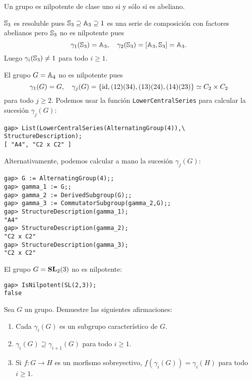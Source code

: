 
\begin{example}
	Un grupo es nilpotente de clase uno si y sólo si es abeliano.
\end{example}

\begin{example}
	$\mathbb{S}_3$ es resoluble pues $\mathbb{S}_3\supseteq \mathbb{A}_3\supseteq 1$ es una serie
	de composición con factores abelianos pero $\mathbb{S}_3$ no es nilpotente pues
	\[
		\gamma_1(\mathbb{S}_3)=\mathbb{A}_3,\quad
		\gamma_2(\mathbb{S}_3)=[\mathbb{A}_3,\mathbb{S}_3]=\mathbb{A}_3.
	\]
	Luego $\gamma_i(\mathbb{S}_3)\ne1$ para todo $i\geq1$. 
\end{example}

\begin{example}
	El grupo $G=\mathbb{A}_4$ no es nilpotente pues 
	\[
		\gamma_1(G)=G,\quad
		\gamma_j(G)=\{\operatorname{id},(12)(34),(13)(24),(14)(23)\}\simeq C_2\times C_2
	\]
	para todo $j\geq2$. Podemos usar la función \lstinline{LowerCentralSeries}
	para calcular la sucesión $\gamma_j(G)$:
	\begin{lstlisting}
gap> List(LowerCentralSeries(AlternatingGroup(4)),\
StructureDescription);
[ "A4", "C2 x C2" ]
	\end{lstlisting}
	Alternativamente, podemos calcular a mano la sucesión $\gamma_j(G)$: 
	\begin{lstlisting}
gap> G := AlternatingGroup(4);;
gap> gamma_1 := G;;
gap> gamma_2 := DerivedSubgroup(G);;
gap> gamma_3 := CommutatorSubgroup(gamma_2,G);;
gap> StructureDescription(gamma_1);
"A4"
gap> StructureDescription(gamma_2);
"C2 x C2"
gap> StructureDescription(gamma_3);
"C2 x C2"
	\end{lstlisting}
\end{example}

\begin{example}
	El grupo $G=\mathbf{SL}_2(3)$ no es nilpotente:
	\begin{lstlisting}
gap> IsNilpotent(SL(2,3));
false
	\end{lstlisting}
\end{example}

\begin{exercise}
	\label{exercise:gamma}
	Sea $G$ un grupo. Demuestre las siguientes afirmaciones:
	\begin{enumerate}
		\item Cada $\gamma_i(G)$ es un subgrupo característico de $G$.
		\item $\gamma_i(G)\supseteq\gamma_{i+1}(G)$ para todo $i\geq1$.
		\item Si $f\colon G\to H$ es un morfismo sobreyectivo,
			$f(\gamma_i(G))=\gamma_i(H)$ para todo $i\geq1$.
	\end{enumerate}
\end{exercise}

